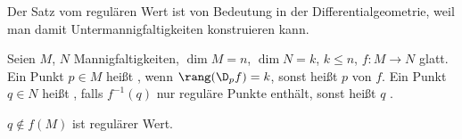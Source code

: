 Der Satz vom regulären Wert ist von Bedeutung in der Differentialgeometrie, weil man damit Untermannigfaltigkeiten konstruieren kann.

\begin{definition}
	Seien $M$, $N$ Mannigfaltigkeiten, $\dim M = n$, $\dim N = k$, $k\le n$, $f\colon M\to N$ glatt. Ein Punkt $p\in M$ heißt , wenn $\rang(\D_p f) = k$, sonst heißt $p$ 
	 von $f$. Ein Punkt $q\in N$ heißt , falls $f^{-1}(q)$ nur reguläre Punkte enthält, sonst heißt $q$ .
\end{definition}

\begin{example}
	$q\notin f(M)$ ist regulärer Wert.
\end{example}

